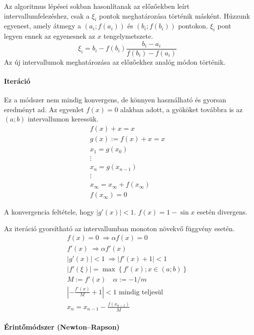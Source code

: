 \documentclass[../../main.tex]{subfiles}
\begin{document}
Az algoritmus lépései sokban hasonlítanak az előzőekben leírt
intervallumfelezéshez, csak a $\xi_i$ pontok meghatározása történik másként.
Húzzunk egyenest, amely átmegy a $(a_i; f(a_i))$ és $(b_i; f(b_i))$
pontokon. $\xi_i$ pont legyen ennek az egyenesnek az $x$ tengelymetszete.
\[
  \xi_i = b_i - f(b_i) \frac{b_i - a_i}{f(b_i) - f(a_i)}
\]
Az új intervallumok meghatározása az előzőekhez analóg módon történik.

\paragraph{Iteráció}

Ez a módszer nem mindig konvergens, de könnyen használható és gyorsan eredményt
ad. Az egyenlet $f(x) = 0$ alakban adott, a gyököket továbbra is az $(a; b)$
intervallumon keressük.
\begin{gather*}
  f(x) + x = x \\
  g(x):= f(x) + x = x \\
  x_1 = g(x_0) \\
  \vdots \\
  x_n = g(x_{n-1}) \\
  \vdots \\
  x_\infty = x_\infty + f(x_\infty) \\
  f(x_\infty) = 0
\end{gather*}

A konvergencia feltétele, hogy $|g'(x)| < 1$. $f(x) = 1 - \sin x$ esetén
divergens.

Az iteráció gyorsítható az intervallumban monoton növekvő függvény esetén.
\begin{gather*}
  f(x) = 0 \; \Rightarrow \alpha f(x) = 0 \\
  f'(x) \; \Rightarrow \alpha f'(x) \\
  |g'(x)| < 1 \; \Rightarrow |f'(x) + 1| < 1 \\
  |f'(\xi)| = \max \left\{ f'(x); x \in (a;b) \right\} \\
  M := f'(x) \quad \alpha := -1/m \\
  \left| -\frac{f'(x)}{M} + 1 \right| < 1 \text{ mindig teljesül} \\
  x_n = x_{n - 1} - \frac{f(x_{n-1})}{M}
\end{gather*}

\paragraph{Érintőmódszer (Newton--Rapson)}
\end{document}
